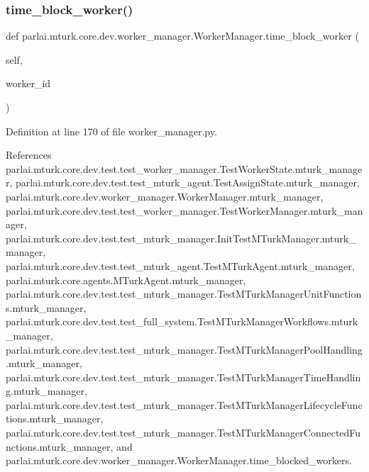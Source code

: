 \subsubsection{\texorpdfstring{time\+\_\+block\+\_\+worker()}{time\_block\_worker()}}
{\footnotesize\ttfamily def parlai.\+mturk.\+core.\+dev.\+worker\+\_\+manager.\+Worker\+Manager.\+time\+\_\+block\+\_\+worker (\begin{DoxyParamCaption}\item[{}]{self,  }\item[{}]{worker\+\_\+id }\end{DoxyParamCaption})}



Definition at line 170 of file worker\+\_\+manager.\+py.



References parlai.\+mturk.\+core.\+dev.\+test.\+test\+\_\+worker\+\_\+manager.\+Test\+Worker\+State.\+mturk\+\_\+manager, parlai.\+mturk.\+core.\+dev.\+test.\+test\+\_\+mturk\+\_\+agent.\+Test\+Assign\+State.\+mturk\+\_\+manager, parlai.\+mturk.\+core.\+dev.\+worker\+\_\+manager.\+Worker\+Manager.\+mturk\+\_\+manager, parlai.\+mturk.\+core.\+dev.\+test.\+test\+\_\+worker\+\_\+manager.\+Test\+Worker\+Manager.\+mturk\+\_\+manager, parlai.\+mturk.\+core.\+dev.\+test.\+test\+\_\+mturk\+\_\+manager.\+Init\+Test\+M\+Turk\+Manager.\+mturk\+\_\+manager, parlai.\+mturk.\+core.\+dev.\+test.\+test\+\_\+mturk\+\_\+agent.\+Test\+M\+Turk\+Agent.\+mturk\+\_\+manager, parlai.\+mturk.\+core.\+agents.\+M\+Turk\+Agent.\+mturk\+\_\+manager, parlai.\+mturk.\+core.\+dev.\+test.\+test\+\_\+mturk\+\_\+manager.\+Test\+M\+Turk\+Manager\+Unit\+Functions.\+mturk\+\_\+manager, parlai.\+mturk.\+core.\+dev.\+test.\+test\+\_\+full\+\_\+system.\+Test\+M\+Turk\+Manager\+Workflows.\+mturk\+\_\+manager, parlai.\+mturk.\+core.\+dev.\+test.\+test\+\_\+mturk\+\_\+manager.\+Test\+M\+Turk\+Manager\+Pool\+Handling.\+mturk\+\_\+manager, parlai.\+mturk.\+core.\+dev.\+test.\+test\+\_\+mturk\+\_\+manager.\+Test\+M\+Turk\+Manager\+Time\+Handling.\+mturk\+\_\+manager, parlai.\+mturk.\+core.\+dev.\+test.\+test\+\_\+mturk\+\_\+manager.\+Test\+M\+Turk\+Manager\+Lifecycle\+Functions.\+mturk\+\_\+manager, parlai.\+mturk.\+core.\+dev.\+test.\+test\+\_\+mturk\+\_\+manager.\+Test\+M\+Turk\+Manager\+Connected\+Functions.\+mturk\+\_\+manager, and parlai.\+mturk.\+core.\+dev.\+worker\+\_\+manager.\+Worker\+Manager.\+time\+\_\+blocked\+\_\+workers.

\mbox{\label{classparlai_1_1mturk_1_1core_1_1dev_1_1worker__manager_1_1WorkerManager_a0cd13932ce8ffc3d6d794b4149ff5a42}} 
